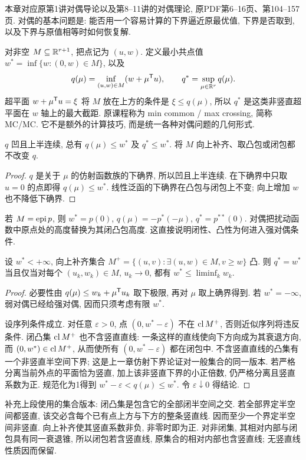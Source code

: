 \label{chap:4}
本章对应原第1讲对偶导论以及第8--11讲的对偶理论, 原PDF第6--16页、第104--157页. 对偶的基本问题是: 能否用一个容易计算的下界逼近原最优值, 下界是否取到, 以及下界与原值相等时如何恢复解.

对非空 $M\subseteq\mathbb R^{r+1}$, 把点记为 $(u,w)$. 定义最小共点值 $w^*=\inf\{w:(0,w)\in M\}$, 以及
\[
q(\mu)=\inf_{(u,w)\in M}(w+\mu^{\mathsf T} u),\qquad q^*=\sup_{\mu\in\mathbb R^r}q(\mu).
\]
超平面 $w+\mu^{\mathsf T} u=\xi$ 将 $M$ 放在上方的条件是 $\xi\le q(\mu)$, 所以 $q^*$ 是这类非竖直超平面在 $w$ 轴上的最大截距. 原课程称为 min common / max crossing, 简称 MC/MC. 它不是额外的计算技巧, 而是统一各种对偶问题的几何形式.

\begin{proposition}[弱对偶]\label{prop:weakdual}
$q$ 凹且上半连续, 总有 $q(\mu)\le w^*$ 及 $q^*\le w^*$. 将 $M$ 向上补齐、取凸包或闭包都不改变 $q$.
\end{proposition}
\begin{proof}
$q$ 是关于 $\mu$ 的仿射函数族的下确界, 所以凹且上半连续. 在下确界中只取 $u=0$ 的点即得 $q(\mu)\le w^*$. 线性泛函的下确界在凸包与闭包上不变; 向上增加 $w$ 也不降低下确界.
\end{proof}
若 $M=\operatorname{epi} p$, 则 $w^*=p(0)$, $q(\mu)=-p^*(-\mu)$, $q^*=p^{**}(0)$. 对偶把扰动函数中原点处的高度替换为其闭凸包高度. 这直接说明闭性、凸性为何进入强对偶条件.

\begin{theorem}[MC/MC 强对偶条件]\label{thm:mc1}
设 $w^*<+\infty$, 向上补齐集合 $M^+=\{(u,v):\exists(u,w)\in M, v\ge w\}$ 凸. 则 $q^*=w^*$ 当且仅当对每个 $(u_k,w_k)\in M$, $u_k\to0$, 都有 $w^*\le\liminf_kw_k$.
\end{theorem}
\begin{proof}
必要性由 $q(\mu)\le w_k+\mu^{\mathsf T} u_k$ 取下极限, 再对 $\mu$ 取上确界得到. 若 $w^*=-\infty$, 弱对偶已经给强对偶, 因而只须考虑有限 $w^*$.

设序列条件成立. 对任意 $\varepsilon>0$, 点 $(0,w^*-\varepsilon)$ 不在 $\operatorname{cl} M^+$, 否则近似序列将违反条件. 闭凸集 $\operatorname{cl} M^+$ 也不含竖直直线: 一条这样的直线使向下方向成为其衰退方向, 而 $(0,w^*)\in\operatorname{cl} M^+$, 从而使所有 $(0,w^*-\varepsilon)$ 都在闭包中. 不含竖直直线的凸集有一个非竖直半空间下界; 这是上一章仿射下界论证对一般集合的同一版本. 若严格分离当前外点的平面恰为竖直, 加上该非竖直下界的小正倍数, 仍严格分离且竖直系数为正. 规范化为1得到 $w^*-\varepsilon<q(\mu)\le w^*$. 令 $\varepsilon\downarrow0$ 得结论.
\end{proof}
补充上段使用的集合版本: 闭凸集是包含它的全部闭半空间之交. 若全部界定半空间都竖直, 该交必含每个已有点上方与下方的整条竖直线. 因而至少一个界定半空间非竖直. 向上补齐使其竖直系数非负, 非零时即为正. 对非闭集, 其相对内部与闭包具有同一衰退锥, 所以闭包若含竖直线, 原集合的相对内部也含竖直线; 无竖直线性质因而保留.


